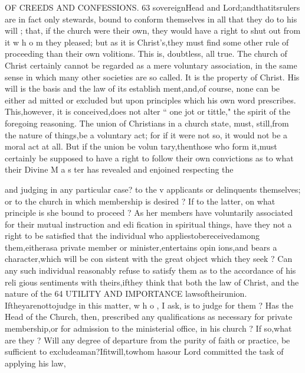 \documentclass[
]{book}
\begin{document}
OF CREEDS AND CONFESSIONS. 63
sovereignHead and Lord;andthatitsrulers
are in fact only stewards, bound to conform
themselves in all that they do to his will ; that,
if the church were their own, they would
have a right to shut out from it w h o m they
pleased; but as it is Christ's,they must find
some other rule of proceeding than their own
volitions. This is, doubtless, all true. The church of Christ certainly cannot be regarded
as a mere voluntary association, in the same
sense in which many other societies are so called. It is the property of Christ. His
will is the basis and the law of its establish
ment,and,of course, none can be either ad
mitted or excluded but upon principles which
his own word prescribes. This,however, it
is conceived,does not alter `` one jot or tittle,"
the spirit of the foregoing reasoning. The union of Christians in a church state, must,
still,from the nature of things,be a voluntary act; for if it were not so, it would not be a moral act at all. But if the union be volun tary,thenthose who form it,must certainly be supposed to have a right to follow their own convictions as to what their Divine M a s ter has revealed and enjoined respecting the

and judging in any particular case? to the v applicants or delinquents themselves; or to the church in which membership is desired ?
If to the latter, on what principle is she bound
to proceed ? As her members have voluntarily associated for their mutual instruction and edi
fication in spiritual things, have they not a right to be satisfied that the individual who
appliestobereceivedamong them,eitherasa private member or minister,entertains opin ions,and bears a character,which will be con
sistent with the great object which they seek ? Can any such individual reasonably refuse to satisfy them as to the accordance of his reli gious sentiments with theirs,ifthey think that both the law of Christ, and the nature of the
64 UTILITY AND IMPORTANCE
lawsoftheirunion. Iftheyarenottojudge
in this matter, w h o , I ask, is to judge for them ? Has the Head of the Church, then,
prescribed any qualifications as necessary for private membership,or for admission to the
ministerial office, in his church ? If so,what are they ? Will any degree of departure from the purity of faith or practice, be sufficient to excludeaman?Ifitwill,towhom hasour Lord committed the task of applying his law,
\end{document}
